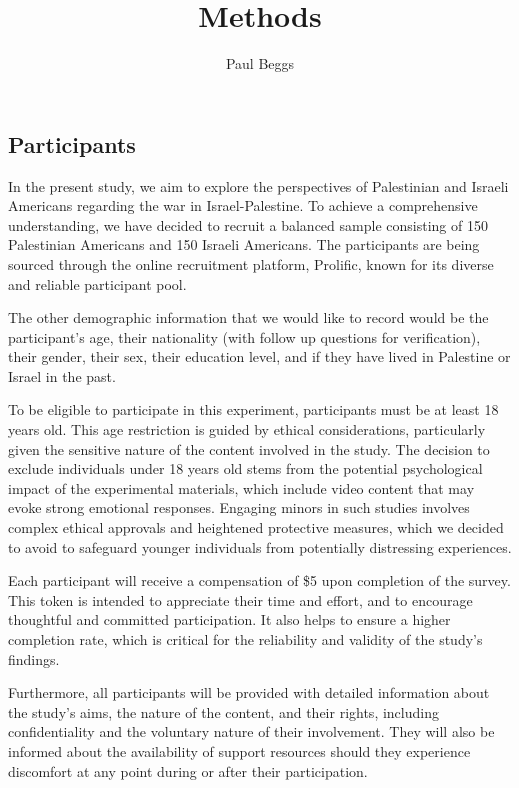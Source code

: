 \documentclass[stu,12pt,floatsintext]{apa7}
\title{Methods} %
\author{Paul Beggs}
\affiliation{Department of Psychology, Hendrix College}
\begin{document}
\maketitle %

\subsection{Participants}

In the present study, we aim to explore the perspectives of Palestinian and Israeli Americans regarding the war in Israel-Palestine. To achieve a comprehensive understanding, we have decided to recruit a balanced sample consisting of 150 Palestinian Americans and 150 Israeli Americans. The participants are being sourced through the online recruitment platform, Prolific, known for its diverse and reliable participant pool.

The other demographic information that we would like to record would be the participant's age, their nationality (with follow up questions for verification), their gender, their sex, their education level, and if they have lived in Palestine or Israel in the past.

To be eligible to participate in this experiment, participants must be at least 18 years old. This age restriction is guided by ethical considerations, particularly given the sensitive nature of the content involved in the study. The decision to exclude individuals under 18 years old stems from the potential psychological impact of the experimental materials, which include video content that may evoke strong emotional responses. Engaging minors in such studies involves complex ethical approvals and heightened protective measures, which we decided to avoid to safeguard younger individuals from potentially distressing experiences.

Each participant will receive a compensation of \$5 upon completion of the survey. This token is intended to appreciate their time and effort, and to encourage thoughtful and committed participation. It also helps to ensure a higher completion rate, which is critical for the reliability and validity of the study's findings.

Furthermore, all participants will be provided with detailed information about the study’s aims, the nature of the content, and their rights, including confidentiality and the voluntary nature of their involvement. They will also be informed about the availability of support resources should they experience discomfort at any point during or after their participation.
\end{document}
